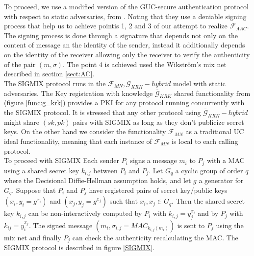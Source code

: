 \documentclass{acm_proc_article-sp}
\begin{document}
To proceed, we use a modified version of the GUC-secure authentication protocol with respect to static adversaries, from
\cite{conf/tcc/DodisKSW09}. Noting that they use a deniable signing process that help us to achieve pointis 1, 2
and 3 of our
attempt to realize $\mathcal{F}_{AAC}$. The signing process is done through a signature that depends
not only on the content of message an the identity of the sender, instead it additionally depends on the identity
of the receiver allowing only the receiver to verify the authenticity of the pair $(m, \sigma)$. The point 4 is
achieved used the Wikstr\"om's mix net described in section \ref{sect:AC}.\\
The SIGMIX protocol runs in the $\mathcal{F}_{MN}, \bar{\mathcal{G}}_{KRK}-hybrid$ model with static adversaries.
The Key registration with knowledge $\bar{\mathcal{G}}_{KRK}$ shared functionality from \cite{conf/tcc/DodisKSW09}
(figure \ref{func:g_krk}) provides a PKI for any protocol running concurrently with the SIGMIX protocol. It is
stressed that any other protocol using $\bar{\mathcal{G}}_{KRK}-hybrid$ might share $(sk,pk)$ pairs with SIGMIX
as long as they don't publicize secret keys.
On the other hand we consider the functionality $\mathcal{F}_{MN}$ as a traditional UC ideal functionality,
meaning that each instance of $\mathcal{F}_{MN}$ is local to each calling protocol.\\
To proceed with SIGMIX Each sender $P_i$ signs
a message $m_i$ to $P_j$ with a MAC using a shared secret key $k_{i,j}$ between $P_i$ and $P_j$.
Let $G_q$ a cyclic group of order $q$ where the Decisional Diffie-Hellman
assumption holds, and let $g$ a generator for $G_q$. Suppose that $P_i$ and $P_j$ have registered pairs of
secret key/public keys $(x_i, y_i=g^{x_i})$ and $(x_j, y_j=g^{x_j})$ such that $x_i, x_j \in G_q$.
Then the shared secret key $k_{i,j}$ can be non-interactively computed by $P_i$ with $k_{i,j}=y_j^{x_i}$ and by
$P_j$ with $k_{ij}=y_i^{x_j}$. The signed message $(m_i, \sigma_{i,j}=MAC_{k_{i,j}(m_i)})$ is sent to $P_j$
using the mix net and finally $P_j$ can check the authenticity recalculating the MAC. The SIGMIX protocol is
described in figure \ref{SIGMIX}.
\end{document}
